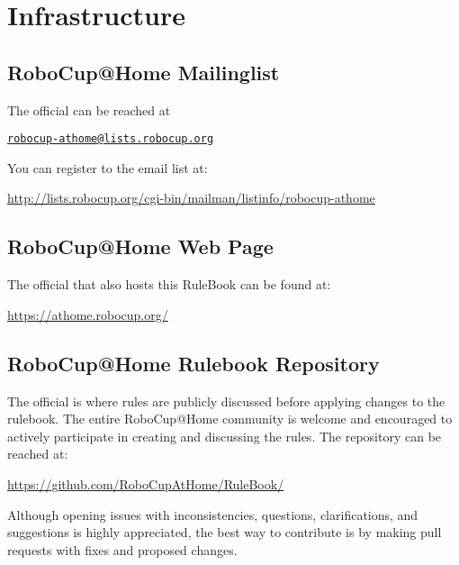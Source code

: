 \section{Infrastructure}
\label{sec:infrastructure}
\subsection{RoboCup@Home Mailinglist}
The official  can be reached at
\begin{center}
\href{mailto:robocup-athome@lists.robocup.org}{\texttt{robocup-athome@lists.robocup.org}}
\end{center}
You can register to the email list at:
\begin{center}
{\small\url{http://lists.robocup.org/cgi-bin/mailman/listinfo/robocup-athome}}
\end{center}

\subsection{RoboCup@Home Web Page}
The official  that also hosts this RuleBook can be found at:
\begin{center}
{\small\url{https://athome.robocup.org/}}
\end{center}

\subsection{RoboCup@Home Rulebook Repository}
The official  is where rules are publicly discussed before applying changes to the rulebook.
The entire RoboCup@Home community is welcome and encouraged to actively participate in creating and discussing the rules. The repository can be reached at:
\begin{center}
{\small\url{https://github.com/RoboCupAtHome/RuleBook/}}
\end{center}

Although opening issues with inconsistencies, questions, clarifications, and suggestions is highly appreciated, the best way to contribute is by making pull requests with fixes and proposed changes.

